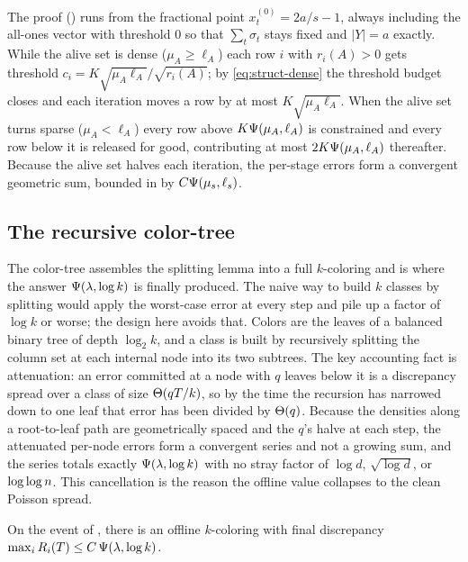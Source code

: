The proof () runs  from the fractional point $x^{(0)}_t=2a/s-1$, always including the
all-ones vector with threshold $0$ so that $\sum_t\sigma_t$ stays fixed and $|Y|=a$ exactly. While the alive set is dense
($\mu_A\ge\ell_A$) each row $i$ with $r_i(A)>0$ gets threshold $c_i=K\sqrt{\mu_A\ell_A}/\sqrt{r_i(A)}$; by
\eqref{eq:struct-dense} the threshold budget closes and each iteration moves a row by at most $K\sqrt{\mu_A\ell_A}$. When the
alive set turns sparse ($\mu_A<\ell_A$) every row above $K\Psi(\mu_A,\ell_A)$ is constrained and every row below it is
released for good, contributing at most $2K\Psi(\mu_A,\ell_A)$ thereafter. Because the alive set halves each iteration,
the per-stage errors form a convergent geometric sum, bounded in  by $C\Psi(\mu_s,\ell_s)$.

\subsection{The recursive color-tree}\label{sec:tree}

The color-tree assembles the splitting lemma into a full $k$-coloring and is where the answer $\Psi(\lambda,\log k)$ is
finally produced. The naive way to build $k$ classes by splitting would apply the worst-case error at every step and pile up
a factor of $\log k$ or worse; the design here avoids that. Colors are the leaves of a balanced binary tree of depth
$\log_2 k$, and a class is built by recursively splitting the column set at each internal node into its two subtrees. The
key accounting fact is attenuation: an error committed at a node with $q$ leaves below it is a discrepancy spread over a
class of size $\Theta(qT/k)$, so by the time the recursion has narrowed down to one leaf that error has been divided by
$\Theta(q)$. Because the densities along a root-to-leaf path are geometrically spaced and the $q$'s halve at each step, the
attenuated per-node errors form a convergent series and not a growing sum, and the series totals exactly $\Psi(\lambda,\log k)$
with no stray factor of $\log d$, $\sqrt{\log d}$, or $\log\log n$. This cancellation is the reason the offline value collapses
to the clean Poisson spread.

\begin{lemma}\label{lem:offline-upper}
On the event of , there is an offline $k$-coloring with final discrepancy
$\max_{i}R_i(T)\le C\,\Psi(\lambda,\log k)$.
\end{lemma}


